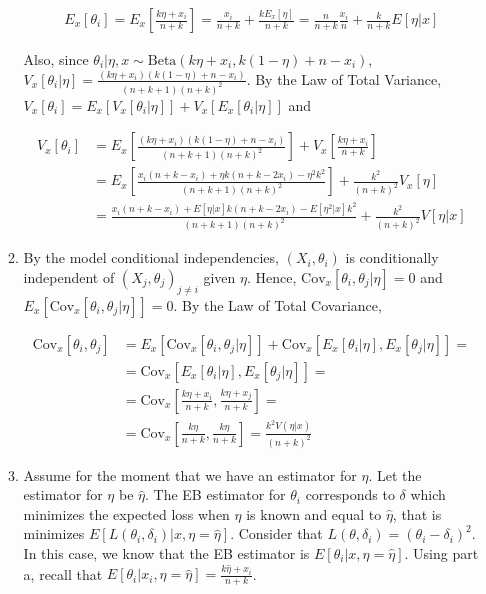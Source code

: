 \documentclass[11pt]{article}
\begin{document}
\begin{enumerate}
\begin{enumerate}
	\begin{align*}	
		E_{x}[\theta_{i}] = E_{x}\left[\frac{k\eta + x_{i}}{n+k}\right] = \frac{x_{i}}{n+k} + \frac{k E_{x}[\eta]}{n+k} = \frac{n}{n+k}\frac{x_{i}}{n} + \frac{k}{n+k}E[\eta|x]  
	\end{align*}

	Also, since $\theta_{i}|\eta,x \sim \text{Beta}(k\eta+x_{i},k(1-\eta)+n-x_{i})$, $V_{x}[\theta_{i}|\eta] = \frac{(k\eta+x_{i})(k(1-\eta)+n-x_{i})}{(n+k+1)(n+k)^2}$. By the Law of Total Variance, $V_{x}[\theta_{i}] = E_{x}[V_{x}[\theta_{i}|\eta]] + V_{x}[E_{x}[\theta_{i}|\eta]]$ and

	\begin{align*}
		V_{x}[\theta_{i}] &= E_{x}\left[\frac{(k\eta+x_{i})(k(1-\eta)+n-x_{i})}{(n+k+1)(n+k)^2}\right] + V_{x}\left[\frac{k\eta + x_{i}}{n+k}\right] \\
											&= E_{x}\left[\frac{x_{i}(n+k-x_{i}) + \eta k (n+k-2x_{i}) - \eta^{2}k^{2}}{(n+k+1)(n+k)^2}\right] + \frac{k^{2}}{(n+k)^{2}} V_{x}[\eta] \\
											&= \frac{x_{i}(n+k-x_{i}) + E[\eta|x]k (n+k-2x_{i}) - E[\eta^{2}|x]k^{2}}{(n+k+1)(n+k)^2} + \frac{k^{2}}{(n+k)^{2}} V[\eta|x]
	\end{align*}
	
	\item	By the model conditional independencies, $(X_{i},\theta_{i})$ is conditionally independent of $(X_{j},\theta_{j})_{j \neq i}$ given $\eta$. Hence, $\text{Cov}_{x}[\theta_{i},\theta_{j}|\eta] = 0$ and $E_{x}[\text{Cov}_{x}[\theta_{i},\theta_{j}|\eta]] = 0$. By the Law of Total Covariance, 
	
	\begin{align*}
		\text{Cov}_{x}[\theta_{i},\theta_{j}] &= E_{x}[\text{Cov}_{x}[\theta_{i},\theta_{j}|\eta]] + \text{Cov}_{x}[E_{x}[\theta_{i}|\eta],E_{x}[\theta_{j}|\eta]] = \\
																					&= \text{Cov}_{x}[E_{x}[\theta_{i}|\eta],E_{x}[\theta_{j}|\eta]] = \\
																					&= \text{Cov}_{x}\left[\frac{k\eta + x_{i}}{n+k},\frac{k\eta + x_{j}}{n+k}\right] =\\
																					&= \text{Cov}_{x}\left[\frac{k\eta}{n+k},\frac{k\eta}{n+k}\right] = \frac{k^{2}V(\eta|x)}{(n+k)^{2}}
	\end{align*}
	
	\item Assume for the moment that we have an estimator for $\eta$. Let the estimator for $\eta$ be $\hat{\eta}$. The EB estimator for $\theta_{i}$ corresponds to $\delta$ which minimizes the expected loss when $\eta$ is known and equal to $\hat{\eta}$, that is minimizes $E[L(\theta_{i},\delta_{i})|x,\eta=\hat{\eta}]$. Consider that $L(\theta,\delta_{i}) = (\theta_{i}-\delta_{i})^{2}$. In this case, we know that the EB estimator is $E[\theta_{i}|x,\eta=\hat{\eta}]$. Using part a, recall that $E[\theta_{i}|x_{i},\eta=\hat{\eta}] = \frac{k\hat{\eta} + x_{i}}{n+k}$.
	

\end{enumerate}
\end{enumerate}
\end{document}
